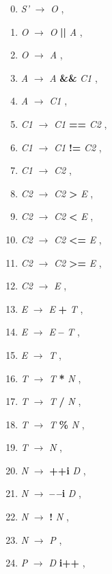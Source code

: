 \begin{enumerate}[label={\arabic*:}]
    \setcounter{enumi}{-1}
    \item \emph{S’} $\longrightarrow$ \emph{O} ,
    \item \emph{O} $\longrightarrow$ \emph{O} \textbf{||} \emph{A} ,
    \item \emph{O} $\longrightarrow$ \emph{A} ,
    \item \emph{A} $\longrightarrow$ \emph{A} \textbf{\&\&} \emph{C1} ,
    \item \emph{A} $\longrightarrow$ \emph{C1} ,
    \item \emph{C1} $\longrightarrow$ \emph{C1} \textbf{==} \emph{C2} ,
    \item \emph{C1} $\longrightarrow$ \emph{C1} \textbf{!=} \emph{C2} ,
    \item \emph{C1} $\longrightarrow$ \emph{C2} ,
    \item \emph{C2} $\longrightarrow$ \emph{C2} \textbf{>} \emph{E} ,
    \item \emph{C2} $\longrightarrow$ \emph{C2} \textbf{<} \emph{E} ,
    \item \emph{C2} $\longrightarrow$ \emph{C2} \textbf{<=} \emph{E} ,
    \item \emph{C2} $\longrightarrow$ \emph{C2} \textbf{>=} \emph{E} ,
    \item \emph{C2} $\longrightarrow$ \emph{E} ,
    \item \emph{E} $\longrightarrow$ \emph{E} \textbf{+} \emph{T} ,
    \item \emph{E} $\longrightarrow$ \emph{E} \textbf{--} \emph{T} ,
    \item \emph{E} $\longrightarrow$ \emph{T} ,
    \item \emph{T} $\longrightarrow$ \emph{T} \textbf{*} \emph{N} ,
    \item \emph{T} $\longrightarrow$ \emph{T} \textbf{/} \emph{N} ,
    \item \emph{T} $\longrightarrow$ \emph{T} \textbf{\%} \emph{N} ,
    \item \emph{T} $\longrightarrow$ \emph{N} ,
    \item \emph{N} $\longrightarrow$ \textbf{++i} \emph{D} ,
    \item \emph{N} $\longrightarrow$ \textbf{--\,--i} \emph{D} ,
    \item \emph{N} $\longrightarrow$ \textbf{!} \emph{N} ,
    \item \emph{N} $\longrightarrow$ \emph{P} ,
    \item \emph{P} $\longrightarrow$ \emph{D} \textbf{i++} ,

\end{enumerate}
